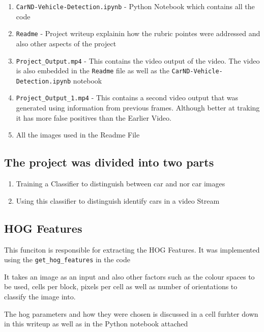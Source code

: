 \documentclass[11pt]{article}
\providecommand{\tightlist}{%
      \setlength{\itemsep}{0pt}\setlength{\parskip}{0pt}}
\begin{document}
\begin{enumerate}
\def\labelenumi{\arabic{enumi}.}
\tightlist
\item
  \texttt{CarND-Vehicle-Detection.ipynb} - Python Notebook which
  contains all the code
\item
  \texttt{Readme} - Project writeup explainin how the rubric pointes
  were addressed and also other aspects of the project
\item
  \texttt{Project\_Output.mp4} - This contains the video output of the
  video. The video is also embedded in the \texttt{Readme} file as well
  as the \texttt{CarND-Vehicle-Detection.ipynb} notebook
\item
  \texttt{Project\_Output\_1.mp4} - This contains a second video output
  that was generated using information from previous frames. Although
  better at traking it has more false positives than the Earlier Video.
\item
  All the images used in the Readme File
\end{enumerate}

    \hypertarget{the-project-was-divided-into-two-parts}{%
\subsection{The project was divided into two
parts}\label{the-project-was-divided-into-two-parts}}

\begin{enumerate}
\def\labelenumi{\arabic{enumi}.}
\tightlist
\item
  Training a Classifier to distinguish between car and nor car images
\item
  Using this classifier to distinguish identify cars in a video Stream
\end{enumerate}

    \hypertarget{hog-features}{%
\subsection{HOG Features}\label{hog-features}}

This funciton is responsible for extracting the HOG Features. It was
implemented using the \texttt{get\_hog\_features} in the code

It takes an image as an input and also other factors such as the colour
spaces to be used, cells per block, pixels per cell as well as number of
orientations to classify the image into.

The hog parameters and how they were chosen is discussed in a cell
furhter down in this writeup as well as in the Python notebook attached
\end{document}
